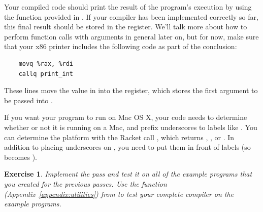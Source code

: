 \documentclass[11pt]{book}
\newtheorem{exercise}[theorem]{Exercise}
\begin{document}
Your compiled code should print the result of the program's execution by using the
 function provided in . If your compiler has been implemented correctly so far, this final result should be stored in the  register.
We'll talk more about
how to perform function calls with arguments in general later on, but
for now, make sure that your x86 printer includes the following code as part of the conclusion:

\begin{lstlisting}
    movq %rax, %rdi
    callq print_int
\end{lstlisting}

These lines move the value in  into the  register, which
stores the first argument to be passed into .

If you want your program to run on Mac OS X, your code needs to
determine whether or not it is running on a Mac, and prefix
underscores to labels like .  You can determine the platform
with the Racket call , which returns
, , or .  In addition to
placing underscores on , you need to put them in front of
 labels (so  becomes ).

\begin{exercise}
\normalfont Implement the  pass and test it on all of
the example programs that you created for the previous passes. Use the
 function (Appendix~\ref{appendix:utilities}) from
 to test your complete compiler on the example
programs. 
\end{exercise}
\end{document}
